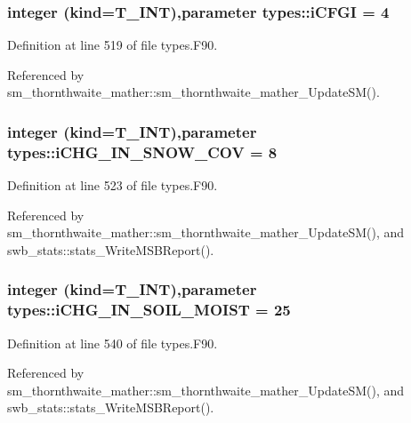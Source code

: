 \hypertarget{namespacetypes_a26dd912760d99d5d582693dd2aad18b5}{
\subsubsection[{iCFGI}]{\setlength{\rightskip}{0pt plus 5cm}integer (kind={\bf T\_\-INT}),parameter {\bf types::iCFGI} = 4}}
\label{namespacetypes_a26dd912760d99d5d582693dd2aad18b5}


Definition at line 519 of file types.F90.



Referenced by sm\_\-thornthwaite\_\-mather::sm\_\-thornthwaite\_\-mather\_\-UpdateSM().

\hypertarget{namespacetypes_aa1bee1fd3093347686b80dcfe4d610a9}{
\subsubsection[{iCHG\_\-IN\_\-SNOW\_\-COV}]{\setlength{\rightskip}{0pt plus 5cm}integer (kind={\bf T\_\-INT}),parameter {\bf types::iCHG\_\-IN\_\-SNOW\_\-COV} = 8}}
\label{namespacetypes_aa1bee1fd3093347686b80dcfe4d610a9}


Definition at line 523 of file types.F90.



Referenced by sm\_\-thornthwaite\_\-mather::sm\_\-thornthwaite\_\-mather\_\-UpdateSM(), and swb\_\-stats::stats\_\-WriteMSBReport().

\hypertarget{namespacetypes_aebcbdc031290e54d10c818440fbf0edd}{
\subsubsection[{iCHG\_\-IN\_\-SOIL\_\-MOIST}]{\setlength{\rightskip}{0pt plus 5cm}integer (kind={\bf T\_\-INT}),parameter {\bf types::iCHG\_\-IN\_\-SOIL\_\-MOIST} = 25}}
\label{namespacetypes_aebcbdc031290e54d10c818440fbf0edd}


Definition at line 540 of file types.F90.



Referenced by sm\_\-thornthwaite\_\-mather::sm\_\-thornthwaite\_\-mather\_\-UpdateSM(), and swb\_\-stats::stats\_\-WriteMSBReport().

